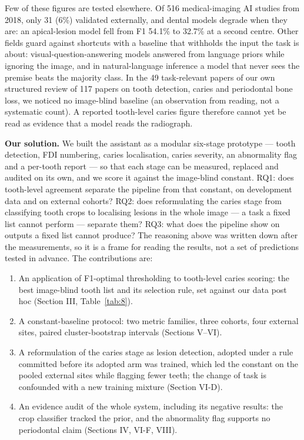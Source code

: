 \documentclass[conference]{IEEEtran}
\begin{document}
Few of these figures are tested elsewhere. Of 516 medical-imaging AI studies from 2018, only 31 (6\%) validated externally, and dental models degrade when they are: an apical-lesion model fell from F1 54.1\% to 32.7\% at a second centre. Other fields guard against shortcuts with a baseline that withholds the input the task is about: visual-question-answering models answered from language priors while ignoring the image, and in natural-language inference a model that never sees the premise beats the majority class. In the 49 task-relevant papers of our own structured review of 117 papers on tooth detection, caries and periodontal bone loss, we noticed no image-blind baseline (an observation from reading, not a systematic count). A reported tooth-level caries figure therefore cannot yet be read as evidence that a model reads the radiograph.

\textbf{Our solution.} We built the assistant as a modular six-stage prototype — tooth detection, FDI numbering, caries localisation, caries severity, an abnormality flag and a per-tooth report — so that each stage can be measured, replaced and audited on its own, and we score it against the image-blind constant. RQ1: does tooth-level agreement separate the pipeline from that constant, on development data and on external cohorts? RQ2: does reformulating the caries stage from classifying tooth crops to localising lesions in the whole image — a task a fixed list cannot perform — separate them? RQ3: what does the pipeline show on outputs a fixed list cannot produce? The reasoning above was written down after the measurements, so it is a frame for reading the results, not a set of predictions tested in advance. The contributions are:

\begin{enumerate}
\item An application of F1-optimal thresholding to tooth-level caries scoring: the best image-blind tooth list and its selection rule, set against our data post hoc (Section III, Table~\ref{tab:8}).
\item A constant-baseline protocol: two metric families, three cohorts, four external sites, paired cluster-bootstrap intervals (Sections V–VI).
\item A reformulation of the caries stage as lesion detection, adopted under a rule committed before its adopted arm was trained, which led the constant on the pooled external sites while flagging fewer teeth; the change of task is confounded with a new training mixture (Section VI-D).
\item An evidence audit of the whole system, including its negative results: the crop classifier tracked the prior, and the abnormality flag supports no periodontal claim (Sections IV, VI-F, VIII).
\end{enumerate}
\end{document}
